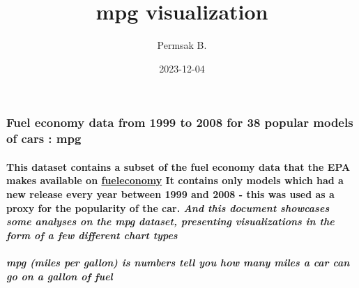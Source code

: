 \documentclass[
]{article}
\title{mpg visualization}
\author{Permsak B.}
\date{2023-12-04}
\begin{document}
\maketitle

{
\setcounter{tocdepth}{6}
\tableofcontents
}
\hypertarget{fuel-economy-data-from-1999-to-2008-for-38-popular-models-of-cars-mpg}{%
\subsubsection{\texorpdfstring{\textbf{Fuel economy data from 1999 to
2008 for 38 popular models of cars :
mpg}}{Fuel economy data from 1999 to 2008 for 38 popular models of cars : mpg}}\label{fuel-economy-data-from-1999-to-2008-for-38-popular-models-of-cars-mpg}}

\hypertarget{this-dataset-contains-a-subset-of-the-fuel-economy-data-that-the-epa-makes-available-on-fueleconomy-it-contains-only-models-which-had-a-new-release-every-year-between-1999-and-2008---this-was-used-as-a-proxy-for-the-popularity-of-the-car.-and-this-document-showcases-some-analyses-on-the-mpg-dataset-presenting-visualizations-in-the-form-of-a-few-different-chart-types}{%
\paragraph{\texorpdfstring{This dataset contains a subset of the fuel
economy data that the EPA makes available on
\href{https://fueleconomy.gov/}{fueleconomy} It contains only models
which had a new release every year between 1999 and 2008 - this was used
as a proxy for the popularity of the car. \textbf{\emph{And this
document showcases some analyses on the mpg dataset, presenting
visualizations in the form of a few different chart
types}}}{This dataset contains a subset of the fuel economy data that the EPA makes available on fueleconomy It contains only models which had a new release every year between 1999 and 2008 - this was used as a proxy for the popularity of the car. And this document showcases some analyses on the mpg dataset, presenting visualizations in the form of a few different chart types}}\label{this-dataset-contains-a-subset-of-the-fuel-economy-data-that-the-epa-makes-available-on-fueleconomy-it-contains-only-models-which-had-a-new-release-every-year-between-1999-and-2008---this-was-used-as-a-proxy-for-the-popularity-of-the-car.-and-this-document-showcases-some-analyses-on-the-mpg-dataset-presenting-visualizations-in-the-form-of-a-few-different-chart-types}}

\hypertarget{mpg-miles-per-gallon-is-numbers-tell-you-how-many-miles-a-car-can-go-on-a-gallon-of-fuel}{%
\subparagraph{\texorpdfstring{\textbf{\emph{mpg (miles per gallon)}} is
numbers tell you how many miles a car can go on a gallon of
fuel}{mpg (miles per gallon) is numbers tell you how many miles a car can go on a gallon of fuel}}\label{mpg-miles-per-gallon-is-numbers-tell-you-how-many-miles-a-car-can-go-on-a-gallon-of-fuel}}
\end{document}
